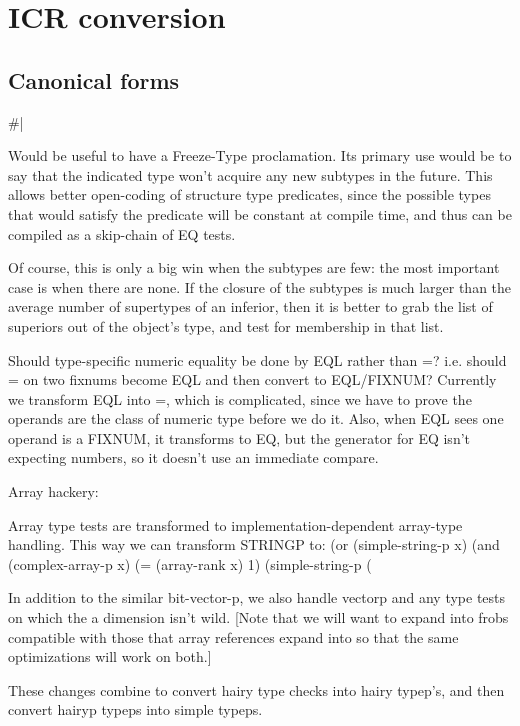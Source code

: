 \chapter{ICR conversion} %



\section{Canonical forms}

\#|

Would be useful to have a Freeze-Type proclamation.  Its primary use would be
to say that the indicated type won't acquire any new subtypes in the future.
This allows better open-coding of structure type predicates, since the possible
types that would satisfy the predicate will be constant at compile time, and
thus can be compiled as a skip-chain of EQ tests.  

Of course, this is only a big win when the subtypes are few: the most important
case is when there are none.  If the closure of the subtypes is much larger
than the average number of supertypes of an inferior, then it is better to grab
the list of superiors out of the object's type, and test for membership in that
list.

Should type-specific numeric equality be done by EQL rather than =?  i.e.
should = on two fixnums become EQL and then convert to EQL/FIXNUM?
Currently we transform EQL into =, which is complicated, since we have to prove
the operands are the class of numeric type before we do it.  Also, when EQL
sees one operand is a FIXNUM, it transforms to EQ, but the generator for EQ
isn't expecting numbers, so it doesn't use an immediate compare.


Array hackery:


Array type tests are transformed to %
implementation-dependent array-type handling.  This way we can transform
STRINGP to:
     (or (simple-string-p x)
	 (and (complex-array-p x)
	      (= (array-rank x) 1)
	      (simple-string-p (%

In addition to the similar bit-vector-p, we also handle vectorp and any type
tests on which the a dimension isn't wild.
[Note that we will want to expand into frobs compatible with those that
array references expand into so that the same optimizations will work on both.]

These changes combine to convert hairy type checks into hairy typep's, and then
convert hairyp typeps into simple typeps.


